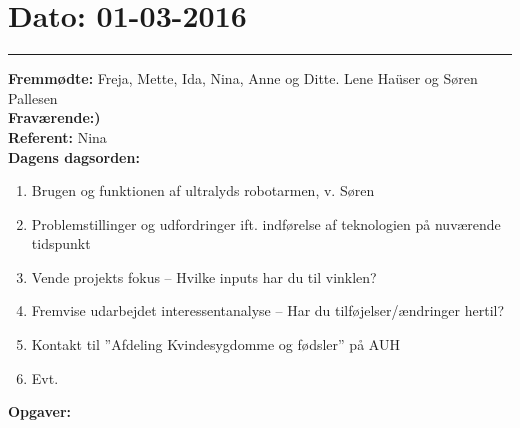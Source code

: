 \section{Dato: 01-03-2016}
\hrule
\textbf{Fremmødte:} Freja, Mette, Ida, Nina, Anne og Ditte. Lene Haüser og Søren Pallesen \\
\textbf{Fraværende:)} \\
\textbf{Referent: } Nina  \\
\textbf{Dagens dagsorden: }
\begin{enumerate}
	\item Brugen og funktionen af ultralyds robotarmen, v. Søren
	\item Problemstillinger og udfordringer ift. indførelse af teknologien på nuværende tidspunkt 
	\item Vende projekts fokus – Hvilke inputs har du til vinklen?
	\item Fremvise udarbejdet interessentanalyse – Har du tilføjelser/ændringer hertil?
	\item Kontakt til ”Afdeling Kvindesygdomme og fødsler” på AUH
	\item Evt. 
\end{enumerate}

\textbf{Opgaver:} \newline

